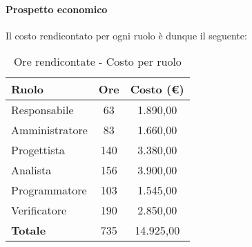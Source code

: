 \documentclass[../PianoProgetto.tex]{subfiles}
\begin{document}
	\paragraph{Prospetto economico}
					Il costo rendicontato per ogni ruolo è dunque il seguente:
	\begin{table}[h]
		\centering
		\begin{tabular}{l * {2}{c}}
			\toprule
			\textbf{Ruolo} & \textbf{Ore} & \textbf{Costo (\euro{})} \\
			\midrule
			Responsabile &	63 & 1.890,00 \\
			Amministratore & 83 & 1.660,00 \\
			Progettista & 140 & 3.380,00 \\
			Analista & 156 & 3.900,00 \\
			Programmatore & 103 & 1.545,00 \\
			Verificatore & 190 & 2.850,00 \\
			\midrule		
			\textbf{Totale} & 735 & 14.925,00 \\
			\bottomrule
		\end{tabular}
		
		\caption{Ore rendicontate - Costo per ruolo}
		\label{tab:rendicontate_costo}
		
	\end{table}
			
\end{document}
